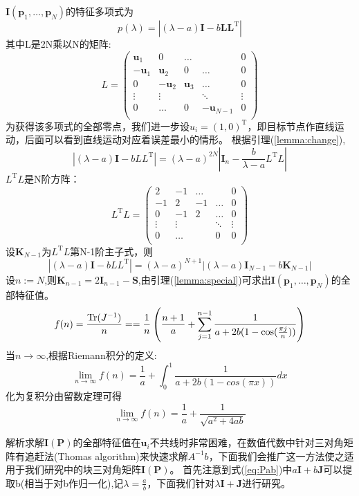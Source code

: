 $\bm{I}(\bm{p}_1,\dots,\bm{p}_N)$的特征多项式为\[
p(\lambda)=|(\lambda-a)\bm{I}-b\bm{L}\bm{L}^{\textrm{T}} |
\]
其中L是2N乘以N的矩阵:
\[
L=\left(
\begin{array}{ccccc}
\bm{u}_1&0&\dots&&0\\
-\bm{u}_1&\bm{u}_2&0&\dots&0\\
0&-\bm{u}_2&\bm{u}_3&\dots&0\\
\vdots &\vdots&&\ddots &\vdots\\
0&\dots&0&-\bm{u}_{N-1}&0\\
\end{array}
\right)
\]
为获得该多项式的全部零点，我们进一步设$u_i=(1,0)^{\textrm{T}} $，即目标节点作直线运动，后面可以看到直线运动对应着误差最小的情形。
根据引理(\ref{lemma:change}),
\[
|(\lambda-a)\bm{I}-bLL^{\textrm{T}} |=(\lambda-a)^{2N}|\bm{I}_n-\frac{b}{\lambda-a}L^{\textrm{T}} L|
\]
$L^{\textrm{T}} L$是N阶方阵：
\[
L^{\textrm{T}} L=\left(
\begin{array}{ccccc}
2&-1&\dots&&0\\
-1&2&-1&\dots&0\\
0&-1&2&\dots&0\\
\vdots &\vdots&&\ddots &\vdots\\
0&\dots&&0&0\\
\end{array}
\right)
\]
设$\bm{K}_{N-1}$为$L^{\textrm{T}} L$第N-1阶主子式，则
\[
|(\lambda-a)\bm{I}-bLL^{\textrm{T}} |=(\lambda-a)^{N+1}|(\lambda-a)\bm{I}_{N-1}-b\bm{K}_{N-1}|
\]
设$n:=N$,则$\bm{K}_{n-1}=2\bm{I}_{n-1}-\bm{S}$,由引理(\ref{lemma:special})可求出$\bm{I}(\bm{p}_1,\dots,\bm{p}_N)$的全部特征值。
\[
f(n)=\frac{\operatorname{Tr}(J^{-1})}{n}==\frac{1}{n}\left(\frac{n+1}{a}+\sum_{j=1}^{n-1}\frac{1}{a+2b(1-\cos(\frac{\pi j}{n}))}\right)
\]
当$n\to \infty$,根据Riemann积分的定义:
\[
\lim_{n\rightarrow \infty}f(n)=\frac{1}{a}+\int_0^1 \frac{1}{a+2b(1-cos(\pi x))}dx
\]
化为复积分由留数定理可得
\begin{equation}\label{eq:a24ab}
\lim_{n\rightarrow \infty}f(n)=\frac{1}{a}+\frac{1}{\sqrt{a^2+4ab}}
\end{equation}

解析求解$\bm{I}(\bm{P})$的全部特征值在$\bm{u}_i$不共线时非常困难，在数值代数中针对三对角矩阵有追赶法(Thomas algorithm)来快速求解$A^{-1}b$\cite{numericalAnalysis}，下面我们会推广这一方法使之适用于我们研究中的块三对角矩阵$\bm{I}(\bm{P})$。
首先注意到式(\ref{eq:Pab})中$a\bm{I}+b\bm{J}$可以提取b(相当于对b作归一化),记$\lambda=\frac{a}{b}$，下面我们针对$\lambda \bm{I}+\bm{J}$进行研究。

